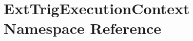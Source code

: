 \section{Ext\-Trig\-Execution\-Context Namespace Reference}
\label{namespaceExtTrigExecutionContext}


